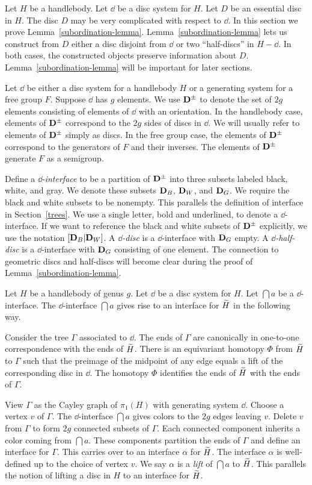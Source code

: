 Let $H$ be a handlebody.  Let $\dd$ be a disc system for $H$.  Let $D$ be an essential disc in $H$.  The disc $D$ may be very complicated with respect to $\dd$.  In this section we prove Lemma~\ref{subordination-lemma}.  Lemma~\ref{subordination-lemma} lets us construct from $D$ either a disc disjoint from $\dd$ or two ``half-discs'' in $H-\dd$.  In both cases, the constructed objects preserve information about $D$.  Lemma~\ref{subordination-lemma} will be important for later sections.

Let $\dd$ be either a disc system for a handlebody $H$ or a generating system for a free group $F$.  Suppose $\dd$ has $g$ elements.  We use $\mathbf{D}^\pm$ to denote the set of $2g$ elements consisting of elements of $\dd$ with an orientation.  In the handlebody case, elements of $\mathbf{D}^\pm$ correspond to the $2g$ sides of discs in $\dd$.  We will usually refer to elements of $\mathbf{D}^\pm$ simply as discs.  In the free group case, the elements of $\mathbf{D}^\pm$ correspond to the generators of $F$ and their inverses.  The elements of $\mathbf{D}^\pm$ generate $F$ as a semigroup.

Define a $\dd$-\emph{interface} to be a partition of $\mathbf{D}^\pm$ into three subsets labeled black, white, and gray.  We denote these subsets $\mathbf{D}_B$, $\mathbf{D}_W$, and $\mathbf{D}_G$.  We require the black and white subsets to be nonempty.  This parallels the definition of interface in Section~\ref{trees}.  We use a single letter, bold and underlined, to denote a $\dd$-interface.  If we want to reference the black and white subsets of $\mathbf{D}^\pm$ explicitly, we use the notation $[\mathbf{D}_B | \mathbf{D}_W]$.  A \emph{$\dd$-disc} is a $\dd$-interface with $\mathbf{D}_G$ empty.  A \emph{$\dd$-half-disc} is a $\dd$-interface with $\mathbf{D}_G$ consisting of one element.  The connection to geometric discs and half-discs will become clear during the proof of Lemma~\ref{subordination-lemma}.

Let $H$ be a handlebody of genus $g$.  Let $\dd$ be a disc system for $H$.  Let $\dint{a}$ be a $\dd$-interface.  The $\dd$-interface $\dint{a}$ gives rise to an interface for $\widetilde{H}$ in the following way.

Consider the tree $\Gamma$ associated to $\dd$.  The ends of $\Gamma$ are canonically in one-to-one correspondence with the ends of $\widetilde{H}$.  There is an equivariant homotopy $\Phi$ from $\widetilde{H}$ to $\Gamma$ such that the preimage of the midpoint of any edge equals a lift of the corresponding disc in $\dd$.  The homotopy $\Phi$ identifies the ends of $\widetilde{H}$ with the ends of $\Gamma$.  

View $\Gamma$ as the Cayley graph of $\pi_{1}(H)$ with generating system $\dd$.  Choose a vertex $v$ of $\Gamma$.  The $\dd$-interface $\dint{a}$ gives colors to the $2g$ edges leaving $v$.  Delete $v$ from $\Gamma$ to form $2g$ connected subsets of $\Gamma$.  Each connected component inherits a color coming from $\dint{a}$.  These components partition the ends of $\Gamma$ and define an interface for $\Gamma$.  This carries over to an interface $\alpha$ for $\widetilde{H}$.  The interface $\alpha$ is well-defined up to the choice of vertex $v$.  We say $\alpha$ is a \emph{lift} of $\dint{a}$ to $\widetilde{H}$.  This parallels the notion of lifting a disc in $H$ to an interface for $\widetilde{H}$.
       

